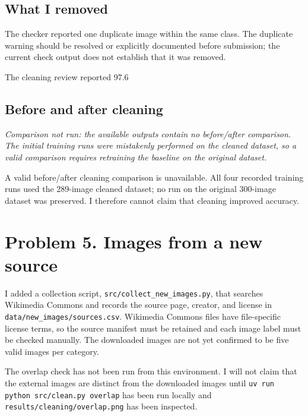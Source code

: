 \documentclass[11pt]{article}
\begin{document}
\subsection*{What I removed}

The checker reported one duplicate image within the same class. The duplicate warning should be resolved or explicitly documented before submission; the current check output does not establish that it was removed.

The cleaning review reported 97.6%

\subsection*{Before and after cleaning}
\textit{Comparison not run: the available outputs contain no before/after comparison. The initial training runs were mistakenly performed on the cleaned dataset, so a valid comparison requires retraining the baseline on the original dataset.}

A valid before/after cleaning comparison is unavailable. All four recorded training runs used the 289-image cleaned dataset; no run on the original 300-image dataset was preserved. I therefore cannot claim that cleaning improved accuracy.

\section*{Problem 5. Images from a new source}

I added a collection script, \texttt{src/collect\_new\_images.py}, that searches Wikimedia Commons and records the source page, creator, and license in \texttt{data/new\_images/sources.csv}. Wikimedia Commons files have file-specific license terms, so the source manifest must be retained and each image label must be checked manually. The downloaded images are not yet confirmed to be five valid images per category.

The overlap check has not been run from this environment. I will not claim that the external images are distinct from the downloaded images until \texttt{uv run python src/clean.py overlap} has been run locally and \texttt{results/cleaning/overlap.png} has been inspected.
\end{document}
